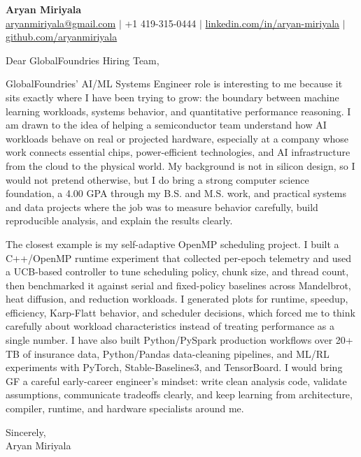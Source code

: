 \documentclass[11pt]{letter}
\begin{document}
\begin{center}
{\Large \textbf{Aryan Miriyala}}\\
\href{mailto:aryanmiriyala@gmail.com}{aryanmiriyala@gmail.com} $|$ +1 419-315-0444 $|$
\href{https://www.linkedin.com/in/aryan-miriyala-7788a21b6/}{linkedin.com/in/aryan-miriyala} $|$
\href{https://github.com/aryanmiriyala}{github.com/aryanmiriyala}
\end{center}

\vspace{0.25in}

Dear GlobalFoundries Hiring Team,

GlobalFoundries' AI/ML Systems Engineer role is interesting to me because it sits exactly where I have been trying to grow: the boundary between machine learning workloads, systems behavior, and quantitative performance reasoning. I am drawn to the idea of helping a semiconductor team understand how AI workloads behave on real or projected hardware, especially at a company whose work connects essential chips, power-efficient technologies, and AI infrastructure from the cloud to the physical world. My background is not in silicon design, so I would not pretend otherwise, but I do bring a strong computer science foundation, a 4.00 GPA through my B.S. and M.S. work, and practical systems and data projects where the job was to measure behavior carefully, build reproducible analysis, and explain the results clearly.

The closest example is my self-adaptive OpenMP scheduling project. I built a C++/OpenMP runtime experiment that collected per-epoch telemetry and used a UCB-based controller to tune scheduling policy, chunk size, and thread count, then benchmarked it against serial and fixed-policy baselines across Mandelbrot, heat diffusion, and reduction workloads. I generated plots for runtime, speedup, efficiency, Karp-Flatt behavior, and scheduler decisions, which forced me to think carefully about workload characteristics instead of treating performance as a single number. I have also built Python/PySpark production workflows over 20+ TB of insurance data, Python/Pandas data-cleaning pipelines, and ML/RL experiments with PyTorch, Stable-Baselines3, and TensorBoard. I would bring GF a careful early-career engineer's mindset: write clean analysis code, validate assumptions, communicate tradeoffs clearly, and keep learning from architecture, compiler, runtime, and hardware specialists around me.

\vspace{0.15in}

Sincerely,\\
Aryan Miriyala
\end{document}
